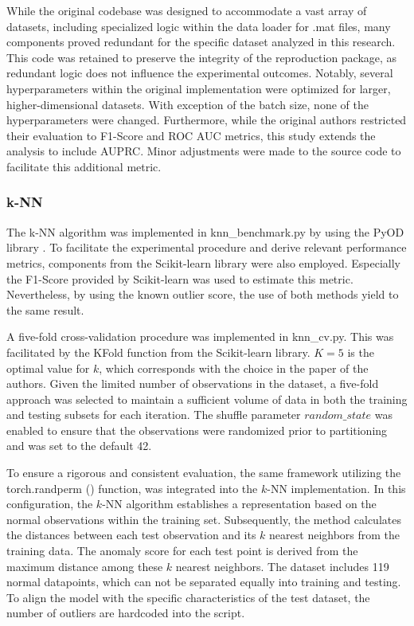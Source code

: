 While the original codebase was designed to accommodate a vast array of datasets, including specialized logic within the data loader for .mat files, many components proved redundant for the specific dataset analyzed in this research. 
This code was retained to preserve the integrity of the reproduction package, as redundant logic does not influence the experimental outcomes. 
Notably, several hyperparameters within the original implementation were optimized for larger, higher-dimensional datasets. 
With exception of the batch size, none of the hyperparameters were changed.
Furthermore, while the original authors restricted their evaluation to F1-Score and ROC AUC metrics, this study extends the analysis to include AUPRC. 
Minor adjustments were made to the source code to facilitate this additional metric.


\subsubsection*{k-NN}
The k-NN algorithm was implemented in knn\_benchmark.py by using the PyOD library \citep{zhao2019pyod}. 
To facilitate the experimental procedure and derive relevant performance metrics, components from the Scikit-learn library \citep{pedregosa2011scikit} were also employed. 
Especially the F1-Score provided by Scikit-learn was used to estimate this metric. 
Nevertheless, by using the known outlier score, the use of both methods yield to the same result.


A five-fold cross-validation procedure was implemented in knn\_cv.py.
This was facilitated by the KFold function from the Scikit-learn library. 
$K = 5$ is the optimal value for $k$, which corresponds with the choice in the paper of the authors. 
Given the limited number of observations in the dataset, a five-fold approach was selected to maintain a sufficient volume of data in both the training and testing subsets for each iteration. 
The shuffle parameter $random\_state$ was enabled to ensure that the observations were randomized prior to partitioning and was set to the default 42. 


To ensure a rigorous and consistent evaluation, the same framework utilizing the torch.randperm () function, was integrated into the $k$-NN implementation. 
In this configuration, the $k$-NN algorithm establishes a representation based on the normal observations within the training set. 
Subsequently, the method calculates the distances between each test observation and its $k$ nearest neighbors from the training data. 
The anomaly score for each test point is derived from the maximum distance among these $k$ nearest neighbors. 
The dataset includes 119 normal datapoints, which can not be separated equally into training and testing.
To align the model with the specific characteristics of the test dataset, the number of outliers are hardcoded into the script.


